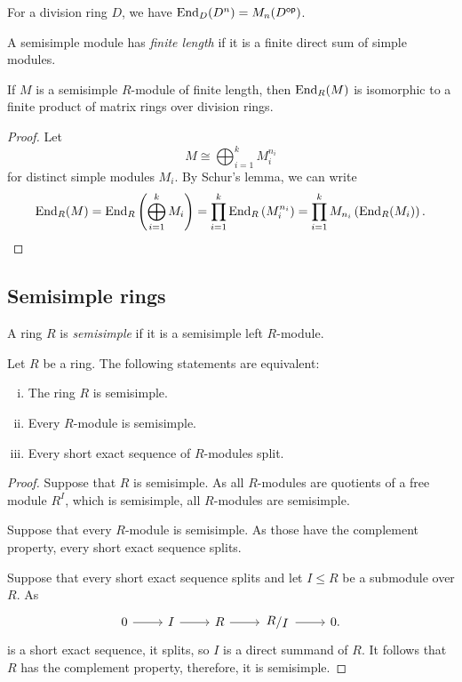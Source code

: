 \begin{posledica}
For a division ring $D$, we have
$\operatorname{End}_D(D^n) = M_n(D^{\mathsf{op}})$.
\end{posledica}	

\begin{definicija}
A semisimple module has \emph{finite length}
if it is a finite direct sum of simple modules.
\end{definicija}

\begin{trditev}
\label{fin_dim_alg:td:mat_prod}
If $M$ is a semisimple $R$-module of finite length, then
$\operatorname{End}_R(M)$ is isomorphic to a finite product of matrix rings over
division rings.
\end{trditev}

\begin{proof}
Let
\[
M \cong \bigoplus_{i=1}^k M_i^{n_i}
\]
for distinct simple modules $M_i$. By Schur's lemma, we can write
\[
\operatorname{End}_R(M) =
\operatorname{End}_R \left(\bigoplus_{i=1}^k M_i\right) =
\prod_{i=1}^k \operatorname{End}_R \left(M_i^{n_i}\right) =
\prod_{i=1}^k M_{n_i} \left(\operatorname{End}_R(M_i)\right). \qedhere
\]
\end{proof}

\newpage

\subsection{Semisimple rings}

\begin{definicija}
A ring $R$ is \emph{semisimple} if it is a
semisimple left $R$-module.
\end{definicija}

\begin{izrek}
Let $R$ be a ring. The following statements are equivalent:

\begin{enumerate}[i)]
\item The ring $R$ is semisimple.
\item Every $R$-module is semisimple.
\item Every short exact sequence of $R$-modules split.
\end{enumerate}
\end{izrek}

\begin{proof}
Suppose that $R$ is semisimple. As all $R$-modules are quotients of
a free module $R^I$, which is semisimple, all $R$-modules are
semisimple.

Suppose that every $R$-module is semisimple. As those have the
complement property, every short exact sequence splits.

Suppose that every short exact sequence splits and let $I \leq R$
be a submodule over $R$. As
\[
\begin{tikzcd}
0 \arrow[r] & I \arrow[r] & R \arrow[r] &
\kvoc{R}{I} \arrow[r] & 0.
\end{tikzcd}
\]
is a short exact sequence, it splits, so $I$ is a direct summand
of $R$. It follows that $R$ has the complement property, therefore,
it is semisimple.
\end{proof}

